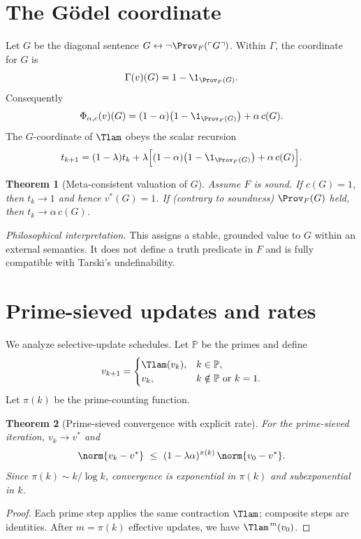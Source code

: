 \documentclass[12]{amsart}
\theoremstyle{plain}
\newtheorem{theorem}{Theorem}[section]
\begin{document}
\section{The G\"odel coordinate}\label{sec:Godel}

Let $G$ be the diagonal sentence $G\leftrightarrow \neg\Prov_F(\ulcorner G\urcorner)$. Within $\Gamma$, the coordinate for $G$ is
\[
\Gamma(v)(G)=1-\1_{\Prov_F(G)}.
\]
Consequently
\[
\Phi_{\alpha,c}(v)(G)=(1-\alpha)\bigl(1-\1_{\Prov_F(G)}\bigr)+\alpha\,c(G).
\]
The $G$-coordinate of $\Tlam$ obeys the scalar recursion
\[
t_{k+1}=(1-\lambda)t_k + \lambda\Bigl[(1-\alpha)\bigl(1-\1_{\Prov_F(G)}\bigr)+\alpha\,c(G)\Bigr].
\]

\begin{theorem}[Meta-consistent valuation of $G$]\label{thm:Godel}
Assume $F$ is sound. If $c(G)=1$, then $t_k\to 1$ and hence $v^*(G)=1$.
If (contrary to soundness) $\Prov_F(G)$ held, then $t_k\to \alpha\,c(G)$.
\end{theorem}

\noindent\textit{Philosophical interpretation.} This assigns a stable, grounded value to $G$ within an external semantics. It does not define a truth predicate in $F$ and is fully compatible with Tarski's undefinability.

\section{Prime-sieved updates and rates}\label{sec:prime}

We analyze selective-update schedules. Let $\mathbb{P}$ be the primes and define
\[
v_{k+1}=
\begin{cases}
\Tlam(v_k), & k\in\mathbb{P},\\
v_k, & k\notin\mathbb{P}\ \text{or }k=1.
\end{cases}
\]
Let $\pi(k)$ be the prime-counting function.

\begin{theorem}[Prime-sieved convergence with explicit rate]\label{thm:prime}
For the prime-sieved iteration, $v_k\to v^*$ and
\[
\norm{v_k-v^*}\ \le\ (1-\lambda\alpha)^{\pi(k)}\,\norm{v_0-v^*}.
\]
Since $\pi(k)\sim k/\log k$, convergence is exponential in $\pi(k)$ and subexponential in $k$.
\end{theorem}

\begin{proof}
Each prime step applies the same contraction $\Tlam$; composite steps are identities. After $m=\pi(k)$ effective updates, we have $\Tlam^{\,m}(v_0)$.
\end{proof}
\end{document}
